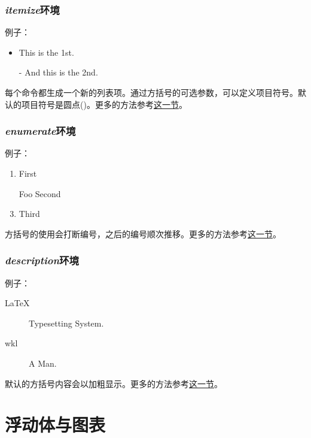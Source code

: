 {\subsubsection{\textit{itemize}环境}
例子：

\begin{codeshow}
\begin{itemize}
  \item This is the 1st.
  \item[-] And this is the 2nd.
\end{itemize}
\end{codeshow}

每个\latexline{\\item}命令都生成一个新的列表项。通过方括号的可选参数，可以定义项目符号。默认的项目符号是圆点(\latexline{\\textbullet})。更多的方法参考\hyperref[sec:list]{这一节}。

\subsubsection{\textit{enumerate}环境}
例子：

\begin{codeshow}
\begin{enumerate}
  \item First
  \item[Foo] Second
  \item Third
\end{enumerate}
\end{codeshow}

方括号的使用会打断编号，之后的编号顺次推移。更多的方法参考\hyperref[sec:list]{这一节}。

\subsubsection{\textit{description}环境}
例子：

\begin{codeshow}
\begin{description}
  \item[LaTeX] Typesetting System.
  \item[wkl] A Man.
\end{description}
\end{codeshow}

默认的方括号内容会以加粗显示。更多的方法参考\hyperref[sec:list]{这一节}。

\section{浮动体与图表}
\label{sec:float}

}
